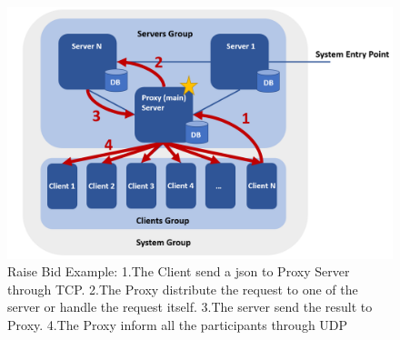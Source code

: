 \begin{figure}
\includegraphics[width=\textwidth]{Raise Bid Example.png}
\caption{Raise Bid Example: 1.The Client send a json to Proxy Server through TCP. 2.The Proxy distribute the request to one of the server or handle the request itself. 3.The server send the result to Proxy. 4.The Proxy inform all the participants through UDP} \label{fig1}
\end{figure}


